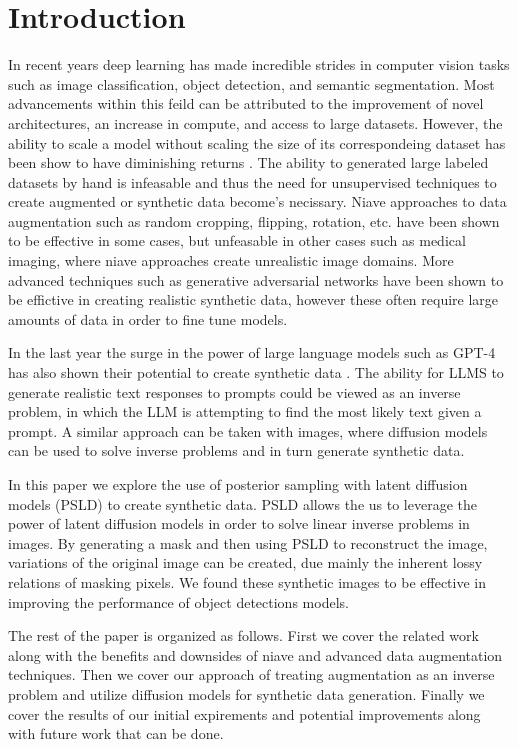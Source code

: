 \documentclass{article}
\begin{document}
\section{Introduction}
\label{introdcution}

In recent years deep learning has made incredible strides in computer vision tasks such as image classification,
object detection, and semantic segmentation. Most advancements within this feild can be attributed to the improvement
of novel architectures, an increase in compute, and access to large datasets. However, the ability to scale a model
without scaling the size of its correspondeing dataset has been show to have diminishing returns \cite{2001.08361}.
The ability to generated large labeled datasets by hand is infeasable and thus the need for unsupervised techniques to create
augmented or synthetic data become's necissary. Niave approaches to data augmentation such as random cropping, flipping,
rotation, etc. have been shown to be effective in some cases, but unfeasable in other cases such as medical imaging, where
niave approaches create unrealistic image domains. More advanced techniques such as generative adversarial networks
\cite{1406.2661} have been shown to be effictive in creating realistic synthetic data, however these often require large amounts of data in
order to fine tune models.

In the last year the surge in the power of large language models such as GPT-4 has also shown their potential to create synthetic
data \cite{2304.13861}. The ability for LLMS to generate realistic text responses to prompts could be viewed as an inverse problem, in which the LLM is attempting
to find the most likely text given a prompt. A similar approach can be taken with images, where diffusion models can be used to solve
inverse problems and in turn generate synthetic data.

In this paper we explore the use of posterior sampling with latent diffusion models (PSLD) \cite{rout2023solving} to create synthetic data. PSLD
allows the us to leverage the power of latent diffusion models in order to solve linear inverse problems in images. By
generating a mask and then using PSLD to reconstruct the image, variations of the original image can be created,
due mainly the inherent lossy relations of masking pixels. We found these synthetic images to be effective in improving
the performance of object detections models.

The rest of the paper is organized as follows. First we cover the related work along with the benefits and downsides of niave and advanced data
augmentation techniques. Then we cover our approach of treating augmentation as an inverse problem and utilize diffusion
models for synthetic data generation. Finally we cover the results of our initial expirements and potential improvements along
with future work that can be done.
 
\end{document}
